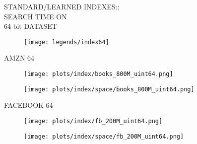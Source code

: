 \documentclass{article}
\begin{document}
\begin{figure}[!htbp]
\fbox
{
\begin{minipage}[t][0.98\textheight][t]{\textwidth}
\centering
\vspace*{-0.2cm}
    \begin{minipage}{0.23\linewidth}
    \footnotesize{STANDARD/LEARNED INDEXES::\\SEARCH TIME ON \\ 64 bit DATASET}
    \end{minipage}
   \begin{minipage}{0.75\linewidth}
        \begin{figure}[H]
        \texttt{[image: legends/index64]}
        \end{figure}
    \end{minipage}
    \vspace*{-10px}

    \begin{minipage}{0.05\linewidth}
    \begin{sideways}\small AMZN 64 \end{sideways}
    \end{minipage}
    \begin{minipage}{0.3\linewidth}
        \begin{figure}[H]
        \texttt{[image: plots/index/books\_800M\_uint64.png]}
        \end{figure}
    \end{minipage}
    \begin{minipage}{0.3\linewidth}
        \begin{figure}[H]
            \texttt{[image: plots/index/space/books\_800M\_uint64.png]}
        \end{figure}
    \end{minipage}
    \vspace*{-20px}

    \begin{minipage}{0.05\linewidth}
    \begin{sideways}\small FACEBOOK 64\end{sideways}
    \end{minipage}
    \begin{minipage}{0.3\linewidth}
        \begin{figure}[H]
        \texttt{[image: plots/index/fb\_200M\_uint64.png]}
        \end{figure}
    \end{minipage}
    \begin{minipage}{0.3\linewidth}
        \begin{figure}[H]
            \texttt{[image: plots/index/space/fb\_200M\_uint64.png]}
        \end{figure}
    \end{minipage}
    \vspace*{-20px}


\end{minipage}}
\end{figure}
\end{document}
